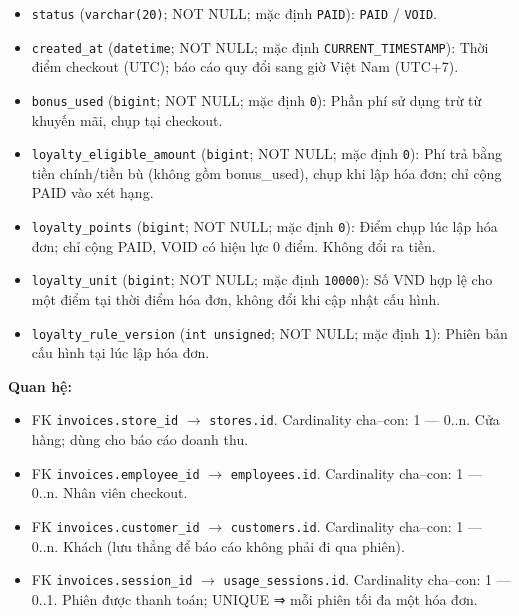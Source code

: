 \begin{itemize}
\item \texttt{status} (\texttt{varchar(20)}; NOT NULL; mặc định \texttt{PAID}): \texttt{PAID} / \texttt{VOID}.

\item \texttt{created\_at} (\texttt{datetime}; NOT NULL; mặc định \texttt{CURRENT\_TIMESTAMP}): Thời điểm checkout (UTC); báo cáo quy đổi sang giờ Việt Nam (UTC+7).

\item \texttt{bonus\_used} (\texttt{bigint}; NOT NULL; mặc định \texttt{0}): Phần phí sử dụng trừ từ khuyến mãi, chụp tại checkout.

\item \texttt{loyalty\_eligible\_amount} (\texttt{bigint}; NOT NULL; mặc định \texttt{0}): Phí trả bằng tiền chính/tiền bù (không gồm bonus_used), chụp khi lập hóa đơn; chỉ cộng PAID vào xét hạng.

\item \texttt{loyalty\_points} (\texttt{bigint}; NOT NULL; mặc định \texttt{0}): Điểm chụp lúc lập hóa đơn; chỉ cộng PAID, VOID có hiệu lực 0 điểm. Không đổi ra tiền.

\item \texttt{loyalty\_unit} (\texttt{bigint}; NOT NULL; mặc định \texttt{10000}): Số VND hợp lệ cho một điểm tại thời điểm hóa đơn, không đổi khi cập nhật cấu hình.

\item \texttt{loyalty\_rule\_version} (\texttt{int unsigned}; NOT NULL; mặc định \texttt{1}): Phiên bản cấu hình tại lúc lập hóa đơn.

\end{itemize}

\textbf{Quan hệ:}

\begin{itemize}

\item FK \texttt{invoices.store\_id} $\rightarrow$ \texttt{stores.id}. Cardinality cha--con: 1 — 0..n. Cửa hàng; dùng cho báo cáo doanh thu.

\item FK \texttt{invoices.employee\_id} $\rightarrow$ \texttt{employees.id}. Cardinality cha--con: 1 — 0..n. Nhân viên checkout.

\item FK \texttt{invoices.customer\_id} $\rightarrow$ \texttt{customers.id}. Cardinality cha--con: 1 — 0..n. Khách (lưu thẳng để báo cáo không phải đi qua phiên).

\item FK \texttt{invoices.session\_id} $\rightarrow$ \texttt{usage\_sessions.id}. Cardinality cha--con: 1 — 0..1. Phiên được thanh toán; UNIQUE ⇒ mỗi phiên tối đa một hóa đơn.

\end{itemize}

